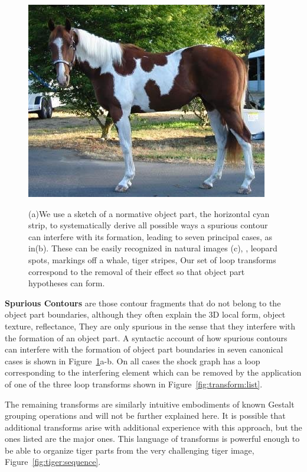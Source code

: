 \begin{figure}[!h]
{\includegraphics[height=0.110\linewidth]{figs/horse49.jpg}  
}
\caption{\FigureFont (a)We use a sketch of a normative object part, the horizontal cyan
strip, to systematically derive all possible ways a spurious contour can
 interfere with its formation, leading to  seven
principal cases, as in(b). These can be easily recognized in natural images (c), \eg, leopard spots, markings off a whale, tiger stripes,
\etc Our set of 
loop transforms correspond to the removal of their effect so that object part hypotheses can form.}
   \label{fig:loop:transforms}
\end{figure}

\textbf{Spurious Contours} are those contour fragments that do not belong to the object part boundaries, although they often explain the 3D local form, object texture, reflectance, \etc
They are only spurious in the sense that they interfere with the formation of an object part. A syntactic account of how spurious contours can interfere with the formation of object part boundaries in seven canonical cases is shown in Figure~\ref{fig:loop:transforms}a-b. On all cases the shock graph has a loop corresponding to the interfering element which can be removed by the application of one of the three loop transforms shown in Figure~\ref{fig:transform:list}.  

The remaining transforms are similarly intuitive embodiments of known Gestalt grouping
operations and will not be further explained here. It is possible that additional transforms arise with additional experience  with this approach, but the ones listed are the major ones. This language of transforms is powerful enough to be able to organize tiger parts from the very challenging tiger image, Figure~\ref{fig:tiger:sequence}. 
  


